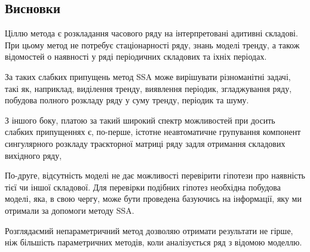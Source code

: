 \subsection{Висновки}

Ціллю метода є розкладання часового ряду на інтерпретовані адитивні складові. При цьому метод не потребує стаціонарності ряду, знань моделі тренду, а також відомостей о наявності у ряді періодичних складових та іхніх періодах.

За таких слабких припущень метод SSA може вирішувати різноманітні задачі, такі як, наприклад, виділення тренду, виявлення періодик, згладжування ряду, побудова полного розкладу ряду у суму тренду, періодик та шуму.

З іншого боку, платою за такий широкий спектр можливостей при досить слабких припущеннях є, по-перше, істотне неавтоматичне групування компонент сингулярного розкладу траєкторної матриці ряду задля отримання складових вихідного ряду, 

По-друге, відсутність моделі не дає можливості перевірити гіпотези про наявність тієї чи іншої складової. Для перевірки подібних гіпотез необхідна побудова моделі, яка, в свою чергу, може бути проведена базуючись на інформації, яку ми отримали за допомоги методу SSA.

Розглядаємий непараметричний метод дозволяю отримати результати не гірше, ніж більшість параметричних методів, коли аналізується ряд з відомою моделлю.
